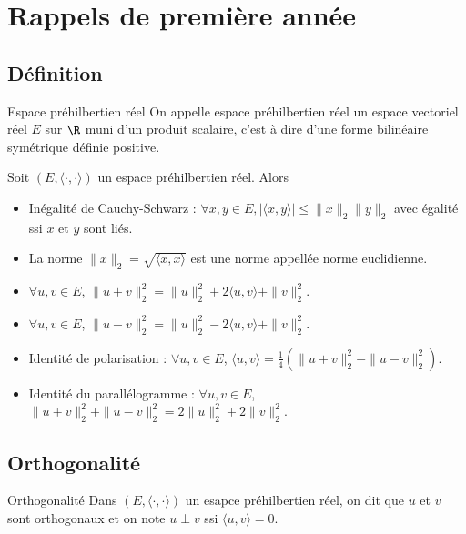 \section{Rappels de première année}
\subsection{Définition}

\begin{definition}{Espace préhilbertien réel}{}
    On appelle espace préhilbertien réel un espace vectoriel réel $E$
    sur $\R$ muni d'un produit scalaire, c'est à dire d'une forme 
    bilinéaire symétrique définie positive.
\end{definition}

\begin{proposition}{}{}
    Soit $(E, \langle \cdot, \cdot \rangle)$ un espace préhilbertien réel. Alors
    \begin{itemize}
        \item Inégalité de Cauchy-Schwarz : $\forall x, y \in E, |\langle x, y \rangle| \leqslant \|x\|_2 \|y\|_2$ avec 
        égalité ssi $x$ et $y$ sont liés.
        \item La norme $\|x\|_2 = \sqrt{\langle x, x \rangle}$ est une norme appellée norme euclidienne.
        \item $\forall u, v \in E$, $\|u + v\|_2^2 = \|u\|_2^2 + 2\langle u, v \rangle + \|v\|_2^2$.
        \item $\forall u, v \in E$, $\|u - v\|_2^2 = \|u\|_2^2 - 2\langle u, v \rangle + \|v\|_2^2$.
        \item Identité de polarisation : $\forall u, v \in E$, $\langle u, v \rangle = \frac{1}{4}(\|u + v\|_2^2 - \|u - v\|_2^2)$.
        \item Identité du parallélogramme : $\forall u, v \in E$, $\|u + v\|_2^2 + \|u - v\|_2^2 = 2\|u\|_2^2 + 2\|v\|_2^2$.
    \end{itemize}
\end{proposition}

\subsection{Orthogonalité}

\begin{definition}{Orthogonalité}{}
    Dans $(E, \langle \cdot, \cdot \rangle)$ un esapce préhilbertien réel, on dit que 
    $u$ et $v$ sont orthogonaux et on note $u \perp v$ ssi $\langle u, v \rangle = 0$.
\end{definition}

